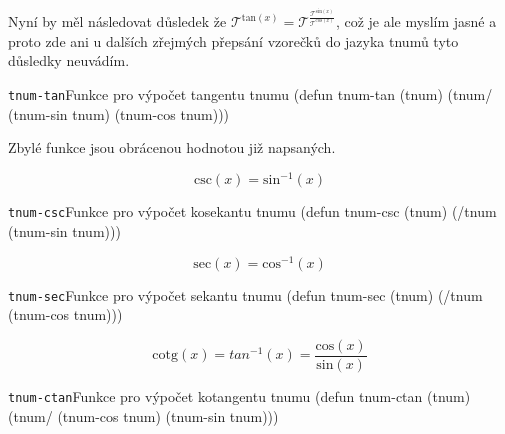 \begin{convention}
Nyní by měl následovat důsledek že $\mathcal{T}^{\mathrm{tan}(x)}=\mathcal{T}^{\frac{\mathcal{T}^{\mathrm{sin}(x)}}{\mathcal{T}^{\mathrm{cos}(x)}}}$, což je ale myslím jasné a proto zde ani u dalších zřejmých přepsání vzorečků do jazyka tnumů tyto důsledky neuvádím.
\end{convention}

\begin{lispcode}{\texttt{tnum-tan}}{Funkce pro výpočet tangentu tnumu}
(\textcolor{funkcionalni}{defun} \textcolor{pojmenovan}{tnum-tan} (tnum)
  (\textcolor{moje}{tnum/} (\textcolor{moje}{tnum-sin} tnum) (\textcolor{moje}{tnum-cos} tnum)))
\end{lispcode}

Zbylé funkce jsou obrácenou hodnotou již napsaných.

\begin{fact}
  \begin{equation}
    \mathrm{csc}(x)=\mathrm{sin}^{-1}(x)
  \end{equation}
\end{fact}
\begin{lispcode}{\texttt{tnum-csc}}{Funkce pro výpočet kosekantu tnumu}
(\textcolor{funkcionalni}{defun} \textcolor{pojmenovan}{tnum-csc} (tnum)
  (\textcolor{moje}{/tnum} (\textcolor{moje}{tnum-sin} tnum)))
\end{lispcode}

\begin{fact}
  \begin{equation}
    \mathrm{sec}(x)=\mathrm{cos}^{-1}(x)
  \end{equation}
\end{fact}
\begin{lispcode}{\texttt{tnum-sec}}{Funkce pro výpočet sekantu tnumu}
(\textcolor{funkcionalni}{defun} \textcolor{pojmenovan}{tnum-sec} (tnum)
  (\textcolor{moje}{/tnum} (\textcolor{moje}{tnum-cos} tnum)))
\end{lispcode}

\begin{fact}
  \begin{equation}
    \mathrm{cotg}(x)=tan^{-1}(x)=\frac{\mathrm{cos}(x)}{\mathrm{sin}(x)}
  \end{equation}
\end{fact}
\begin{lispcode}{\texttt{tnum-ctan}}{Funkce pro výpočet kotangentu tnumu}
(\textcolor{funkcionalni}{defun} \textcolor{pojmenovan}{tnum-ctan} (tnum)
  (\textcolor{moje}{tnum/} (\textcolor{moje}{tnum-cos} tnum) (\textcolor{moje}{tnum-sin} tnum)))
\end{lispcode}

